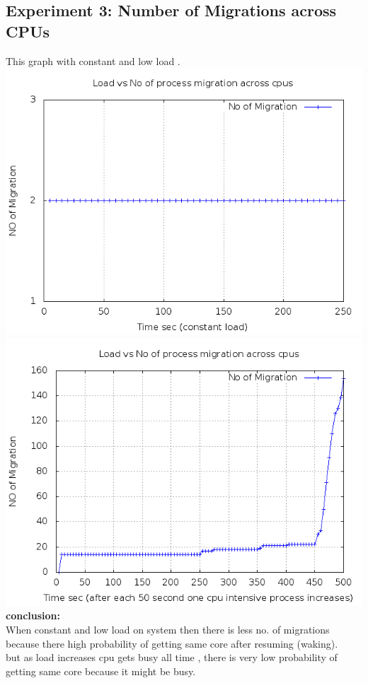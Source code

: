 \documentclass[a4paper,11pt]{report}
\begin{document}
 \subsection{Experiment 3: Number of Migrations across CPUs}
 This graph with constant and low load .\\
 \includegraphics[scale=0.5]{mig1.png}\\
 \includegraphics[scale=0.5]{mig2.png}\\
 {\bf conclusion:} \\When constant and low load on system then there is less no. of migrations because there high probability of getting same core after resuming (waking).\\
 but as load increases cpu gets busy all time , there is very low probability of getting same core because it might be busy.
\end{document}
